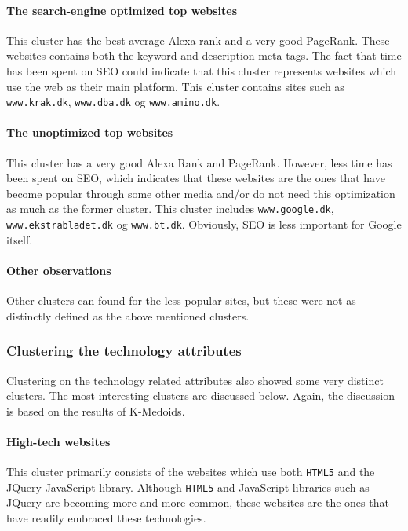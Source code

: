 \paragraph{The search-engine optimized top websites} 

This cluster has the best average Alexa rank and a very good PageRank. These websites contains both the keyword and description meta tags. The fact that time has been spent on SEO could indicate that this cluster represents websites which use the web as their main platform. This cluster contains sites such as \verb|www.krak.dk|, \verb|www.dba.dk| og \verb|www.amino.dk|.

\paragraph{The unoptimized top websites} 

This cluster has a very good Alexa Rank and PageRank. However, less time has been spent on SEO, which indicates that these websites are the ones that have become popular through some other media and/or do not need this optimization as much as the former cluster. This cluster includes \verb|www.google.dk|, \verb|www.ekstrabladet.dk| og \verb|www.bt.dk|. Obviously, SEO is less important for Google itself.

\paragraph{Other observations} Other clusters can found for the less popular sites, but these were not as distinctly defined as the above mentioned clusters.

\subsubsection{Clustering the technology attributes}

Clustering on the technology related attributes also showed some very distinct clusters. The most interesting clusters are discussed below. Again, the discussion is based on the results of K-Medoids.

\paragraph{High-tech websites}

This cluster primarily consists of the websites which use both \texttt{HTML5} and the JQuery JavaScript library. Although \texttt{HTML5} and JavaScript libraries such as JQuery are becoming more and more common, these websites are the ones that have readily embraced these technologies.

